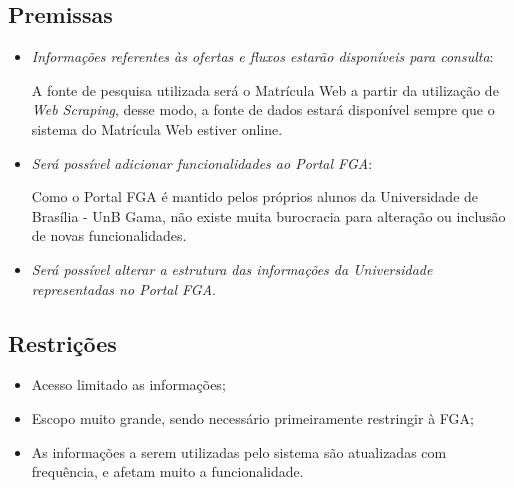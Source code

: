 \subsection{Premissas} %
\label{sub:premissas}

\begin{itemize}
	\item \textit{Informações referentes às ofertas e fluxos estarão disponíveis para consulta}:

		A fonte de pesquisa utilizada será o Matrícula Web a partir da utilização de \textit{Web Scraping}, desse modo, a fonte de dados estará disponível sempre que o sistema do Matrícula Web estiver online.

	\item \textit{Será possível adicionar funcionalidades ao Portal FGA}:

		Como o Portal FGA é mantido pelos próprios alunos da Universidade de Brasília - UnB Gama, não existe muita burocracia para alteração ou inclusão de novas funcionalidades.

	\item \textit{Será possível alterar a estrutura das informações da Universidade representadas no Portal FGA}.
\end{itemize}


\subsection{Restrições} %
\label{sub:restri_es}

\begin{itemize}
	\item Acesso limitado as informações;
	\item Escopo muito grande, sendo necessário primeiramente restringir à FGA;
	\item As informações a serem utilizadas pelo sistema são atualizadas com frequência, e afetam muito a funcionalidade.
\end{itemize}

